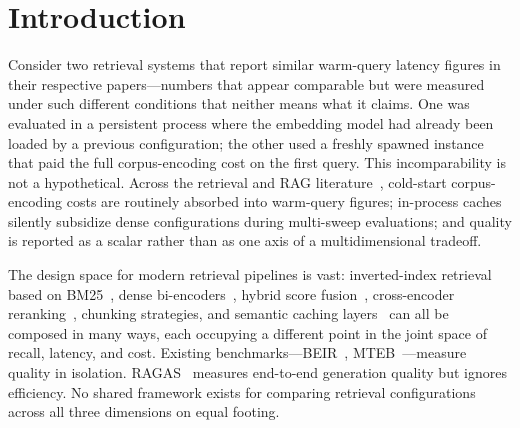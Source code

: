 \documentclass[11pt,a4paper]{article}
\begin{document}
\begin{abstract}
$p\!<\!0.001$).
The 0.040 dense--BM25 gap falls below our pre-specified minimum detectable
effect ($\Delta_{\min}\!=\!0.07$) and correspondingly does not reach
significance ($z\!=\!1.64$, $p\!=\!0.10$); this study is underpowered for
differences of this magnitude ($n \geq 1{,}500$ would be needed for 80\,\%
power at $\Delta = 0.04$).
A span-level evaluation on LegalBench-RAG PrivacyQA ($n=194$) reveals a
domain-dependent reversal: dense retrieval achieves Recall@12 of 0.791 vs.\
0.282 for BM25 ($z=10.06$, $p<0.001$), showing that BM25's lexical matching
fails on paraphrastic specialized-domain text.
All code, configurations, and result data are available at
\url{https://github.com/sgupta285/Research-Projects/tree/main/rag-pareto-frontiers}.
\end{abstract}

\section{Introduction}
\label{sec:intro}

Consider two retrieval systems that report similar warm-query latency figures
in their respective papers---numbers that appear comparable but were measured
under such different conditions that neither means what it claims.
One was evaluated in a persistent process where the embedding model had already
been loaded by a previous configuration; the other used a freshly spawned
instance that paid the full corpus-encoding cost on the first query.
This incomparability is not a hypothetical.
Across the retrieval and RAG literature~\citep{lewis2020rag}, cold-start
corpus-encoding costs are routinely absorbed into warm-query figures;
in-process caches silently subsidize dense configurations during multi-sweep
evaluations; and quality is reported as a scalar rather than as one axis of a
multidimensional tradeoff.

The design space for modern retrieval pipelines is vast: inverted-index
retrieval based on BM25~\citep{robertson2009bm25},
dense bi-encoders~\citep{karpukhin2020dpr},
hybrid score fusion~\citep{cormack2009rrf,lin2022aggretriever},
cross-encoder reranking~\citep{nogueira2019passage},
chunking strategies, and semantic caching layers~\citep{bang2023gptcache}
can all be composed in many ways, each occupying a different point in the
joint space of recall, latency, and cost.
Existing benchmarks---BEIR~\citep{thakur2021beir},
MTEB~\citep{muennighoff2023mteb}---measure quality in isolation.
RAGAS~\citep{es2023ragas} measures end-to-end generation quality but ignores
efficiency.
No shared framework exists for comparing retrieval configurations across all
three dimensions on equal footing.
\end{document}
